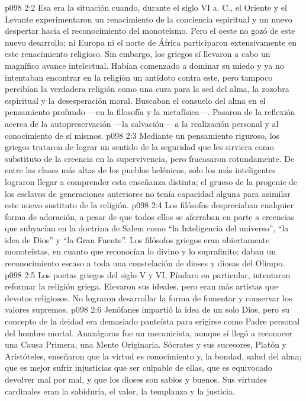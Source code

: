 \vs p098 2:2 Esa era la situación cuando, durante el siglo VI a. C., el Oriente y el Levante experimentaron un renacimiento de la conciencia espiritual y un nuevo despertar hacia el reconocimiento del monoteísmo. Pero el oeste no gozó de este nuevo desarrollo; ni Europa ni el norte de África participaron extensivamente en este renacimiento religioso. Sin embargo, los griegos sí llevaron a cabo un magnífico avance intelectual. Habían comenzado a dominar su miedo y ya no intentaban encontrar en la religión un antídoto contra este, pero tampoco percibían la verdadera religión como una cura para la sed del alma, la zozobra espiritual y la desesperación moral. Buscaban el consuelo del alma en el pensamiento profundo ---en la filosofía y la metafísica---. Pasaron de la reflexión acerca de la autopreservación ---la salvación--- a la realización personal y al conocimiento de sí mismos.
\vs p098 2:3 Mediante un pensamiento riguroso, los griegos trataron de lograr un sentido de la seguridad que les sirviera como substituto de la creencia en la supervivencia, pero fracasaron rotundamente. De entre las clases más altas de los pueblos helénicos, solo los más inteligentes lograron llegar a comprender esta enseñanza distinta; el grueso de la progenie de los esclavos de generaciones anteriores no tenía capacidad alguna para asimilar este nuevo sustituto de la religión.
\vs p098 2:4 \pc Los filósofos despreciaban cualquier forma de adoración, a pesar de que todos ellos se aferraban en parte a creencias que subyacían en la doctrina de Salem como “la Inteligencia del universo”, “la idea de Dios” y “la Gran Fuente”. Los filósofos griegos eran abiertamente monoteístas, en cuanto que reconocían lo divino y lo suprafinito; daban un reconocimiento escaso a toda una constelación de dioses y diosas del Olimpo.
\vs p098 2:5 Los poetas griegos del siglo V y VI, Píndaro en particular, intentaron reformar la religión griega. Elevaron sus ideales, pero eran más artistas que devotos religiosos. No lograron desarrollar la forma de fomentar y conservar los valores supremos.
\vs p098 2:6 Jenófanes impartió la idea de un solo Dios, pero su concepto de la deidad era demasiado panteísta para erigirse como Padre personal del hombre mortal. Anaxágoras fue un mecanicista, aunque sí llegó a reconocer una Causa Primera, una Mente Originaria. Sócrates y sus sucesores, Platón y Aristóteles, enseñaron que la virtud es conocimiento y, la bondad, salud del alma; que es mejor sufrir injusticias que ser culpable de ellas, que es equivocado devolver mal por mal, y que los dioses son sabios y buenos. Sus virtudes cardinales eran la sabiduría, el valor, la templanza y la justicia.
